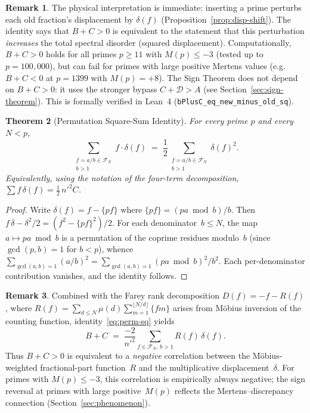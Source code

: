 \documentclass[11pt]{article}
\newtheorem{theorem}{Theorem}[section]
\theoremstyle{definition}
\newtheorem{remark}[theorem]{Remark}
\newcommand{\F}{\mathcal{F}}
\begin{document}
\begin{remark}
The physical interpretation is immediate: inserting a prime
perturbs each old fraction's displacement by $\delta(f)$
(Proposition~\ref{prop:disp-shift}).  The identity says that
$B + C > 0$ is
equivalent to the statement that this perturbation \emph{increases}
the total spectral disorder (squared displacement).
Computationally, $B + C > 0$ holds for all primes
$p \ge 11$ with $M(p) \le -3$ (tested up to $p = 100{,}000$),
but can fail for primes with large positive Mertens values
(e.g.\ $B + C < 0$ at $p = 1399$ with $M(p) = +8$).
The Sign Theorem does not depend on $B + C > 0$:
it uses the stronger bypass $C + \mathcal{D} > A$
(see Section~\ref{sec:sign-theorem}).
This is formally verified in Lean~4 (\texttt{bPlusC\_eq\_new\_minus\_old\_sq}).
\end{remark}

\begin{theorem}[Permutation Square-Sum Identity]\label{thm:perm-sq}
For every prime $p$ and every $N < p$,
\begin{equation}\label{eq:perm-sq}
  \sum_{\substack{f = a/b \in \F_N \\ b > 1}}
    f \cdot \delta(f)
  \;=\; \frac{1}{2}
  \sum_{\substack{f = a/b \in \F_N \\ b > 1}}
    \delta(f)^2.
\end{equation}
Equivalently, using the notation of the four-term decomposition,
$\sum f\,\delta(f) = \tfrac{1}{2}\,{n'}^2 C$.
\end{theorem}

\begin{proof}
Write $\delta(f) = f - \{pf\}$ where $\{pf\} = (pa \bmod b)/b$.
Then $f\,\delta - \delta^2/2 = (f^2 - \{pf\}^2)/2$.
For each denominator~$b \le N$, the map
$a \mapsto pa \bmod b$ is a permutation of the coprime residues
modulo~$b$ (since $\gcd(p,b) = 1$ for $b < p$), whence
$\sum_{\gcd(a,b)=1} (a/b)^2 = \sum_{\gcd(a,b)=1} (pa \bmod b)^2/b^2$.
Each per-denominator contribution vanishes, and the identity follows.
\end{proof}

\begin{remark}\label{rem:perm-sq-consequence}
Combined with the Farey rank decomposition
$D(f) = -f - R(f)$, where $R(f) = \sum_{d \le N} \mu(d)\sum_{m=1}^{\lfloor N/d\rfloor} \{fm\}$
arises from M\"obius inversion of the counting function,
identity~\eqref{eq:perm-sq} yields
\[
  B + C \;=\; \frac{-2}{{n'}^2}\sum_{f \in \F_N,\, b > 1} R(f)\,\delta(f).
\]
Thus $B + C > 0$ is equivalent to a \emph{negative} correlation
between the M\"obius-weighted fractional-part function~$R$
and the multiplicative displacement~$\delta$.
For primes with $M(p) \le -3$, this correlation is
empirically always negative; the sign reversal at primes
with large positive~$M(p)$ reflects the Mertens--discrepancy
connection (Section~\ref{sec:phenomenon}).
\end{remark}
\end{document}
